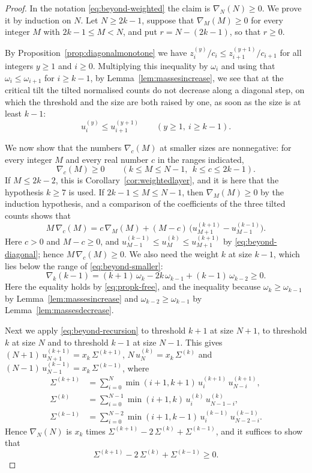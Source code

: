 \documentclass{amsart}
\theoremstyle{definition}
\theoremstyle{remark}
\numberwithin{equation}{section}
\begin{document}
\begin{proof}
In the notation \eqref{eq:beyond-weighted} the claim is $\nabla_N(N)\ge0$. We
prove it by induction on $N$. Let $N\ge2k-1$, suppose that $\nabla_M(M)\ge0$
for every integer $M$ with $2k-1\le M<N$, and put $r=N-(2k-1)$, so that
$r\ge0$.

By Proposition~\ref{prop:diagonalmonotone} we have
$z^{(y)}_i/c_i\le z^{(y+1)}_{i+1}/c_{i+1}$ for all integers $y\ge1$ and
$i\ge0$. Multiplying this inequality by $\omega_i$ and using that
$\omega_i\le\omega_{i+1}$ for $i\ge k-1$, by
Lemma~\ref{lem:massesincrease}, we see that at the critical tilt the tilted
normalised counts do not decrease along a diagonal step, on which the
threshold and the size are both raised by one, as soon as the size is at
least $k-1$:
\begin{equation}\label{eq:beyond-diagonal}
u^{(y)}_i\le u^{(y+1)}_{i+1}\qquad(y\ge1,\ i\ge k-1).
\end{equation}

We now show that the numbers $\nabla_c(M)$ at smaller sizes are
nonnegative: for every integer $M$ and every real number $c$ in the ranges
indicated,
\begin{equation}\label{eq:beyond-smaller}
\nabla_c(M)\ge0\qquad(k\le M\le N-1,\ \ k\le c\le2k-1).
\end{equation}
If $M\le2k-2$, this is Corollary~\ref{cor:weightedlayer}, and it is here
that the hypothesis $k\ge7$ is used. If $2k-1\le M\le N-1$, then
$\nabla_M(M)\ge0$ by the induction hypothesis, and a comparison of the
coefficients of the three tilted counts shows that
\[
M\,\nabla_c(M)=c\,\nabla_M(M)
+(M-c)\,\bigl(u^{(k+1)}_{M+1}-u^{(k-1)}_{M-1}\bigr) .
\]
Here $c>0$ and $M-c\ge0$, and
$u^{(k-1)}_{M-1}\le u^{(k)}_M\le u^{(k+1)}_{M+1}$ by
\eqref{eq:beyond-diagonal}; hence $M\,\nabla_c(M)\ge0$. We also need the
weight $k$ at size $k-1$, which lies below the range of
\eqref{eq:beyond-smaller}:
\begin{equation}\label{eq:beyond-bottom}
\nabla_k(k-1)=(k+1)\,\omega_k-2k\,\omega_{k-1}+(k-1)\,\omega_{k-2}\ge0 .
\end{equation}
Here the equality holds by \eqref{eq:propk-free}, and the inequality
because $\omega_k\ge\omega_{k-1}$ by Lemma~\ref{lem:massesincrease} and
$\omega_{k-2}\ge\omega_{k-1}$ by Lemma~\ref{lem:massesdecrease}.

Next we apply \eqref{eq:beyond-recursion} to
threshold $k+1$ at size $N+1$, to threshold $k$ at size $N$
and to threshold $k-1$ at size $N-1$. This gives
$(N+1)\,u^{(k+1)}_{N+1}=x_k\,\Sigma^{(k+1)}$,
$N\,u^{(k)}_N=x_k\,\Sigma^{(k)}$ and
$(N-1)\,u^{(k-1)}_{N-1}=x_k\,\Sigma^{(k-1)}$, where
\begin{align*}
\Sigma^{(k+1)}&=\sum_{i=0}^{N}\min(i+1,k+1)\,u^{(k+1)}_i\,u^{(k+1)}_{N-i},\\
\Sigma^{(k)}&=\sum_{i=0}^{N-1}\min(i+1,k)\,u^{(k)}_i\,u^{(k)}_{N-1-i},\\
\Sigma^{(k-1)}&=\sum_{i=0}^{N-2}\min(i+1,k-1)\,u^{(k-1)}_i\,u^{(k-1)}_{N-2-i}.
\end{align*}
Hence $\nabla_N(N)$ is $x_k$ times
$\Sigma^{(k+1)}-2\,\Sigma^{(k)}+\Sigma^{(k-1)}$, and it suffices to show
that
\[
\Sigma^{(k+1)}-2\,\Sigma^{(k)}+\Sigma^{(k-1)}\ge0 .
\]


\end{proof}
\end{document}
